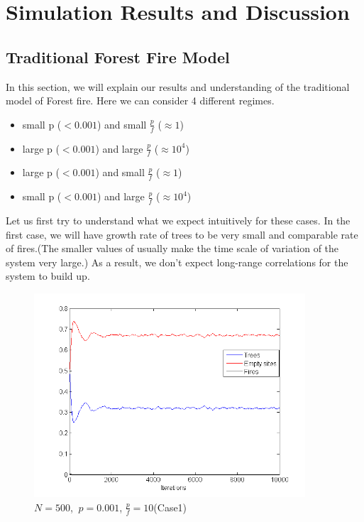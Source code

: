 \documentclass[11pt]{article}
\begin{document}
\section{Simulation Results and Discussion}
\subsection{Traditional Forest Fire Model}

In this section, we will explain our results and understanding of the traditional model of Forest fire. Here we can consider 4 different regimes. 
\begin{itemize}
\item small p ($< 0.001$) and small $\frac{p}{f}$ ($\approx 1$)
\item large p ($< 0.001$) and large $\frac{p}{f}$ ($\approx 10^4$)
\item large p ($< 0.001$) and small $\frac{p}{f}$ ($\approx 1$)
\item small p ($< 0.001$) and large $\frac{p}{f}$ ($\approx 10^4$)
\end{itemize}

Let us first try to understand what we expect intuitively for these cases. In the first case, we will have growth rate of trees to be very small and comparable rate of fires.(The smaller values of usually make the time scale of variation of the system very large.) As a result, we don't expect long-range correlations for the system to build up.\\

\begin{figure}[H]
\centering
\includegraphics[width=0.9\textwidth,keepaspectratio=true,]{Pictures/case1_size_500.png}
\caption{$N=500$, $\ p=0.001$, $\frac{p}{f}=10$(Case1)}
\end{figure}
\end{document}
